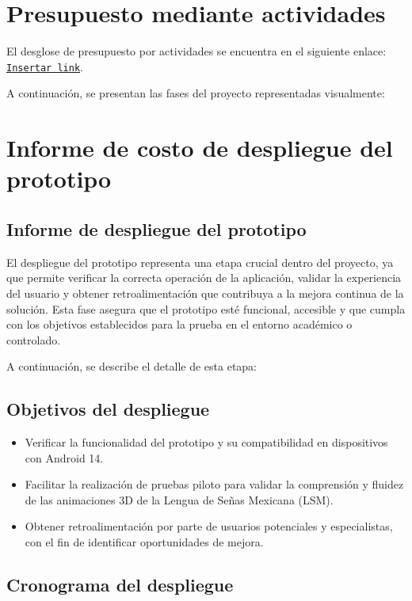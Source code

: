 \section{Presupuesto mediante actividades}

El desglose de presupuesto por actividades se encuentra en el siguiente enlace: \\
\texttt{\url{Insertar link}}.

A continuación, se presentan las fases del proyecto representadas visualmente:

\newpage

\section{Informe de costo de despliegue del prototipo}

\subsection{Informe de despliegue del prototipo}

El despliegue del prototipo representa una etapa crucial dentro del proyecto, ya que permite verificar la correcta operación de la aplicación, validar la experiencia del usuario y obtener retroalimentación que contribuya a la mejora continua de la solución. Esta fase asegura que el prototipo esté funcional, accesible y que cumpla con los objetivos establecidos para la prueba en el entorno académico o controlado.

A continuación, se describe el detalle de esta etapa:

\subsection{Objetivos del despliegue}

\begin{itemize}
	\item Verificar la funcionalidad del prototipo y su compatibilidad en dispositivos con Android 14.
	\item Facilitar la realización de pruebas piloto para validar la comprensión y fluidez de las animaciones 3D de la Lengua de Señas Mexicana (LSM).
	\item Obtener retroalimentación por parte de usuarios potenciales y especialistas, con el fin de identificar oportunidades de mejora.
\end{itemize}

\subsection{Cronograma del despliegue}

